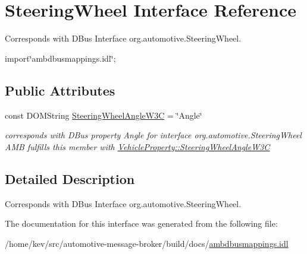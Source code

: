 \hypertarget{interfaceSteeringWheel}{\section{Steering\+Wheel Interface Reference}
\label{interfaceSteeringWheel}
}


Corresponds with D\+Bus Interface org.\+automotive.\+Steering\+Wheel.  




{\ttfamily import\char`\"{}ambdbusmappings.\+idl\char`\"{};}

\subsection*{Public Attributes}
\begin{DoxyCompactItemize}
\item 
\hypertarget{interfaceSteeringWheel_ae97a606756309f61df6d5fa62fc60705}{const D\+O\+M\+String \hyperlink{interfaceSteeringWheel_ae97a606756309f61df6d5fa62fc60705}{Steering\+Wheel\+Angle\+W3\+C} = \char`\"{}Angle\char`\"{}}\label{interfaceSteeringWheel_ae97a606756309f61df6d5fa62fc60705}

\begin{DoxyCompactList}\small\item\em corresponds with D\+Bus property Angle for interface org.\+automotive.\+Steering\+Wheel A\+M\+B fulfills this member with \hyperlink{classVehicleProperty_afb3708166c9863053de47a7dfcd0a09e}{Vehicle\+Property\+::\+Steering\+Wheel\+Angle\+W3\+C} \end{DoxyCompactList}\end{DoxyCompactItemize}


\subsection{Detailed Description}
Corresponds with D\+Bus Interface org.\+automotive.\+Steering\+Wheel. 

The documentation for this interface was generated from the following file\+:\begin{DoxyCompactItemize}
\item 
/home/kev/src/automotive-\/message-\/broker/build/docs/\hyperlink{ambdbusmappings_8idl}{ambdbusmappings.\+idl}\end{DoxyCompactItemize}
